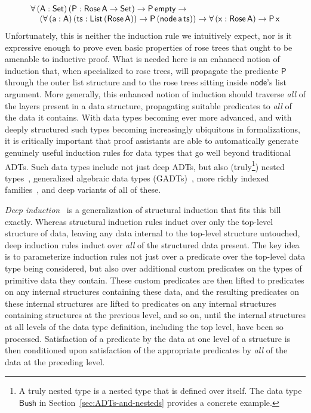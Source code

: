 \documentclass[9pt]{entcs}
\begin{document}
\[\begin{array}{l}
\mathsf{\forall\, (A : Set)\,(P : Rose\,A \to Set) \to P\,empty \to}\\
\mathsf{\hspace*{0.15in}
 (\forall\, (a : A)\,(ts :
  List\,(Rose\,A)) \to P\,(node\,a\,ts)) \to 
  \forall \,(x : Rose\,A) \to P\,x}
\end{array}\]
\noindent
Unfortunately, this is neither the induction rule we intuitively
expect, nor is it expressive enough to prove even basic properties of
rose trees that ought to be amenable to inductive proof. What is
needed here is an enhanced notion of induction that, when specialized
to rose trees, will propagate the predicate $\mathsf{P}$ through the
outer list structure and to the rose trees sitting inside
$\mathsf{node}$'s list argument. More generally, this enhanced notion
of induction should traverse {\em all} of the layers present in a data
structure, propagating suitable predicates to {\em all} of the data it
contains. With data types becoming ever more advanced, and with deeply
structured such types becoming increasingly ubiquitous in
formalizations, it is critically important that proof assistants
are able to automatically generate genuinely useful induction rules
for data types that go well beyond traditional ADTs. Such data types
include not just deep ADTs, but also (truly\footnote{A truly nested
  type is a nested type that is defined over itself. The data type
  $\mathsf{Bush}$ in Section~\ref{sec:ADTs-and-nesteds} provides a
  concrete example.}) nested types~\cite{bm98},
generalized algebraic data types
(GADTs)~\cite{ch03,pvww06,sp04,xcc03}, more richly indexed
families~\cite{ch88}, and deep variants of all of these.

\pagebreak

{\em Deep induction}~\cite{jp20} is a generalization of structural
induction that fits this bill exactly. Whereas structural induction
rules induct over only the top-level structure of data, leaving any
data internal to the top-level structure untouched, deep induction
rules induct over {\em all} of the structured data present. The key
idea is to parameterize induction rules not just over a predicate over
the top-level data type being considered, but also over additional
custom predicates on the types of primitive data they contain. These
custom predicates are then lifted to predicates on any internal
structures containing these data, and the resulting predicates on
these internal structures are lifted to predicates on any internal
structures containing structures at the previous level, and so on,
until the internal structures at all levels of the data type
definition, including the top level, have been so
processed. Satisfaction of a predicate by the data at one level of a
structure is then conditioned upon satisfaction of the appropriate
predicates by {\em all} of the data at the preceding level.
\end{document}
